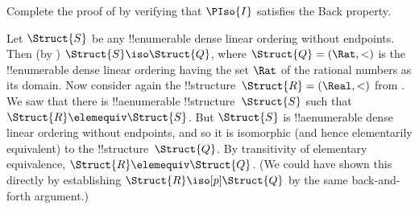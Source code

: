 \documentclass[../../../include/open-logic-section]{subfiles}
\begin{document}
\begin{prob}
  Complete the proof of  by
  verifying that $\PIso{I}$ satisfies the Back property.
\end{prob}

\begin{rem}
  Let $\Struct{S}$ be any !!{enumerable} dense linear ordering without
  endpoints. Then (by ) $\Struct{S} \iso
  \Struct{Q}$, where $\Struct{Q} = (\Rat, <)$ is the !!{enumerable}
  dense linear ordering having the set $\Rat$ of the rational numbers
  as its domain. Now consider again the !!{structure}~$\Struct{R} =
  (\Real, <)$ from . We saw that there is
  !!a{enumerable} !!{structure}~$\Struct{S}$ such that $\Struct{R}
  \elemequiv \Struct{S}$. But $\Struct{S}$ is !!a{enumerable} dense
  linear ordering without endpoints, and so it is isomorphic (and
  hence elementarily equivalent) to the !!{structure}~$\Struct{Q}$. By
  transitivity of elementary equivalence, $\Struct{R} \elemequiv
  \Struct{Q}$. (We could have shown this directly by establishing
  $\Struct{R} \iso[p] \Struct{Q}$ by the same back-and-forth
  argument.)
\end{rem}
\end{document}
